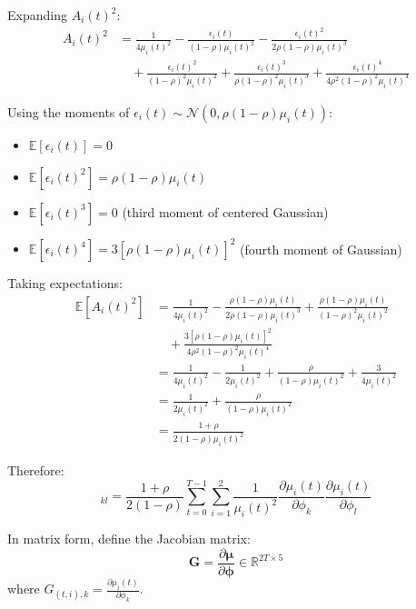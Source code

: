 Expanding $A_i(t)^2$:
\begin{align*}
A_i(t)^2 &= \frac{1}{4\mu_i(t)^2} - \frac{\epsilon_i(t)}{(1-\rho)\mu_i(t)^2} - \frac{\epsilon_i(t)^2}{2\rho(1-\rho)\mu_i(t)^3} \\
&\quad + \frac{\epsilon_i(t)^2}{(1-\rho)^2\mu_i(t)^2} + \frac{\epsilon_i(t)^3}{\rho(1-\rho)^2\mu_i(t)^3} + \frac{\epsilon_i(t)^4}{4\rho^2(1-\rho)^2\mu_i(t)^4}
\end{align*}

Using the moments of $\epsilon_i(t) \sim \mathcal{N}(0, \rho(1-\rho)\mu_i(t))$:
\begin{itemize}
\item $\mathbb{E}[\epsilon_i(t)] = 0$
\item $\mathbb{E}[\epsilon_i(t)^2] = \rho(1-\rho)\mu_i(t)$
\item $\mathbb{E}[\epsilon_i(t)^3] = 0$ (third moment of centered Gaussian)
\item $\mathbb{E}[\epsilon_i(t)^4] = 3[\rho(1-\rho)\mu_i(t)]^2$ (fourth moment of Gaussian)
\end{itemize}

Taking expectations:
\begin{align*}
\mathbb{E}[A_i(t)^2] &= \frac{1}{4\mu_i(t)^2} - \frac{\rho(1-\rho)\mu_i(t)}{2\rho(1-\rho)\mu_i(t)^3} + \frac{\rho(1-\rho)\mu_i(t)}{(1-\rho)^2\mu_i(t)^2} \\
&\quad + \frac{3[\rho(1-\rho)\mu_i(t)]^2}{4\rho^2(1-\rho)^2\mu_i(t)^4} \\
&= \frac{1}{4\mu_i(t)^2} - \frac{1}{2\mu_i(t)^2} + \frac{\rho}{(1-\rho)\mu_i(t)^2} + \frac{3}{4\mu_i(t)^2} \\
&= \frac{1}{2\mu_i(t)^2} + \frac{\rho}{(1-\rho)\mu_i(t)^2}\\
%
%
%
&= \frac{1+\rho}{2(1-\rho)\mu_i(t)^2}
\end{align*}

Therefore:
\begin{equation*}
[\mathbf{J}]_{kl} = \frac{1+\rho}{2(1-\rho)}\sum_{t=0}^{T-1}\sum_{i=1}^{2} \frac{1}{\mu_i(t)^2} \frac{\partial \mu_i(t)}{\partial \phi_k}\frac{\partial \mu_i(t)}{\partial \phi_l}
\end{equation*}

In matrix form, define the Jacobian matrix:
\begin{equation*}
\mathbf{G} = \frac{\partial \boldsymbol{\mu}}{\partial \boldsymbol{\phi}} \in \mathbb{R}^{2T \times 5}
\end{equation*}
where $G_{(t,i),k} = \frac{\partial \mu_i(t)}{\partial \phi_k}$.

